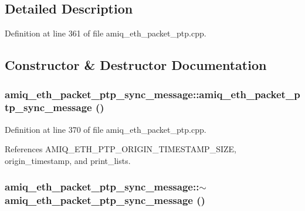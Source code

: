 \subsection{Detailed Description}


Definition at line 361 of file amiq\_\-eth\_\-packet\_\-ptp.cpp.

\subsection{Constructor \& Destructor Documentation}
\hypertarget{classamiq__eth__packet__ptp__sync__message_ad640a426a022d3a795d2ca5930faf864}{
\subsubsection[{amiq\_\-eth\_\-packet\_\-ptp\_\-sync\_\-message}]{\setlength{\rightskip}{0pt plus 5cm}amiq\_\-eth\_\-packet\_\-ptp\_\-sync\_\-message::amiq\_\-eth\_\-packet\_\-ptp\_\-sync\_\-message ()}}
\label{classamiq__eth__packet__ptp__sync__message_ad640a426a022d3a795d2ca5930faf864}


Definition at line 370 of file amiq\_\-eth\_\-packet\_\-ptp.cpp.

References AMIQ\_\-ETH\_\-PTP\_\-ORIGIN\_\-TIMESTAMP\_\-SIZE, origin\_\-timestamp, and print\_\-lists.\hypertarget{classamiq__eth__packet__ptp__sync__message_aa41c9c0ca4a366b0b16ead16d6777bb0}{
\subsubsection[{$\sim$amiq\_\-eth\_\-packet\_\-ptp\_\-sync\_\-message}]{\setlength{\rightskip}{0pt plus 5cm}amiq\_\-eth\_\-packet\_\-ptp\_\-sync\_\-message::$\sim$amiq\_\-eth\_\-packet\_\-ptp\_\-sync\_\-message ()}}
\label{classamiq__eth__packet__ptp__sync__message_aa41c9c0ca4a366b0b16ead16d6777bb0}


